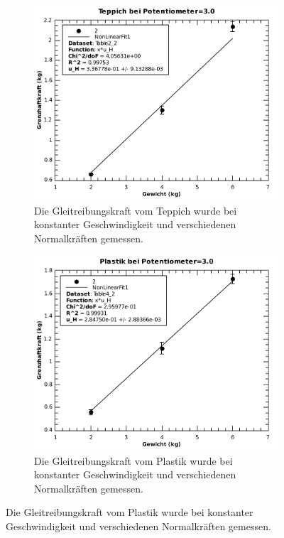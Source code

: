 \begin{figure}[H]
    \centering
    \begin{subfigure}{.7\textwidth}
        \includegraphics[width=\linewidth]{images/teppich_haft_poti=3}
        \caption{Die Gleitreibungskraft vom Teppich wurde bei konstanter Geschwindigkeit und verschiedenen Normalkr\"aften gemessen.}
        \label{fig:teppich_haft_poti=3}
    \end{subfigure}
    \begin{subfigure}{.7\textwidth}
        \includegraphics[width=\linewidth]{images/plastik_haft_poti=3}
        \caption{Die Gleitreibungskraft vom Plastik wurde bei konstanter Geschwindigkeit und verschiedenen Normalkr\"aften gemessen.}
        \label{fig:plastik_haft_poti=3}
    \end{subfigure}
\end{figure}

